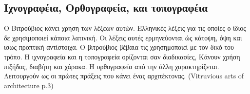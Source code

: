 
  
  
  
  
  

  
\subsection{Ιχνογραφέια, Ορθογραφεία, και τοπογραφέια}
  
  Ο Βιτρούβιος κάνει χρηση των λέξεων αυτών. Ελληνικές λέξεις για τις οποίες ο ίδιος δε χρησιμοποιεί κάποια λατινική. Οι λέξεις αυτές ερμηνεύονται ώς κάτοψη, όψη και ισως προπτική αντίστοιχα. Ο βιτρούβιος βέβαια τις χρησημοποιεί με τον δικό του τρόπο. Η ιχνογραφεία και η τοπογραφεία ορίζονται σαν διαδικασίες, Κάνουν χρήση πιξήδας, διαβήτη και χάρακα. Η ορθογραφεία από την άλλη χαρακτηρίζεται. Λειτουργούν ως οι πρώτες πράξεις που κάνει ένας αρχιτέκτονας. (Vitruvious arts of architecture p.3)
  
